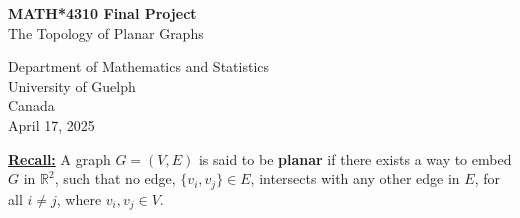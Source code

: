 \documentclass{article}
\begin{document}
\begin{titlepage}
   \begin{center}
       \vspace*{1cm}

       \textbf{MATH*4310 Final Project}\\
       The Topology of Planar Graphs

       \vspace{0.5cm}
       
            
       \vspace{0.8cm}


       \vfill
            
       
            
       \vspace{0.8cm}
            
       Department of Mathematics and Statistics\\
       University of Guelph\\
       Canada\\
       April 17, 2025
            
   \end{center}
\end{titlepage}

\noindent\underline{\textbf{Recall:}} A graph $G = (V,E)$ is said to be \textbf{planar} if there exists a way to embed $G$ in $\mathbb{R}^{2}$, such that no edge, $\{v_{i},v_{j}\} \in E$, intersects with any other edge in $E$, for all $i\neq j$, where $v_{i}, v_{j}\in V$\cite{Fary1948}.\\
\end{document}

